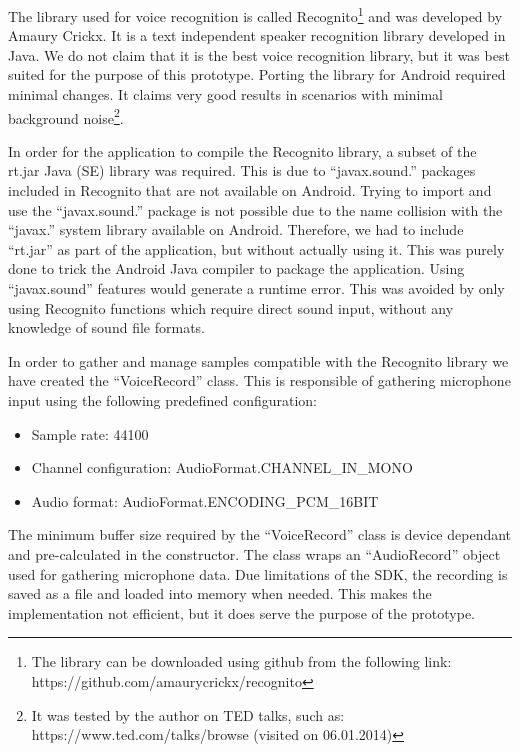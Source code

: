 
The library used for voice recognition is called Recognito\footnote{The library can be downloaded using github from the following link: https://github.com/amaurycrickx/recognito} and was developed by Amaury Crickx. It is a text independent speaker recognition library developed in Java. We do not claim that it is the best voice recognition library, but it was best suited for the purpose of this prototype. Porting the library for Android required minimal changes. It claims very good results in scenarios with minimal background noise\footnote{It was tested by the author on TED talks, such as:  https://www.ted.com/talks/browse (visited on 06.01.2014)}.

In order for the application to compile the Recognito library, a subset of the rt.jar Java (SE) library was required. This is due to ``javax.sound.'' packages included in Recognito that are not available on Android. Trying to import and use the ``javax.sound.'' package is not possible due to the name collision with the ``javax.'' system library available on Android. Therefore, we had to include ``rt.jar'' as part of the application, but without actually using it. This was purely done to trick the Android Java compiler to package the application. Using ``javax.sound'' features would generate a runtime error. This was avoided by only using Recognito functions which require direct sound input, without any knowledge of sound file formats.

In order to gather and manage samples compatible with the Recognito library we have created the ``VoiceRecord'' class. This is responsible of gathering microphone input using the following predefined configuration:
\begin{itemize}
	\item Sample rate: 44100
	\item Channel configuration: AudioFormat.CHANNEL\_IN\_MONO
	\item Audio format: AudioFormat.ENCODING\_PCM\_16BIT
\end{itemize}

The minimum buffer size required by the ``VoiceRecord'' class is device dependant and pre-calculated in the constructor. The class wraps an ``AudioRecord'' object used for gathering microphone data. Due limitations of the SDK, the recording is saved as a file and loaded into memory when needed. This makes the implementation not efficient, but it does serve the purpose of the prototype.

